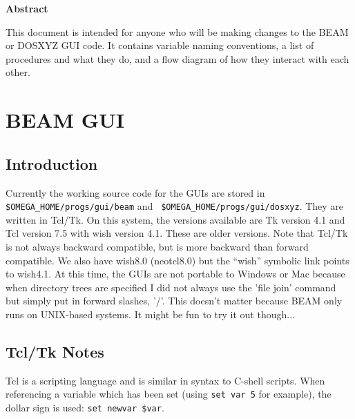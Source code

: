 \documentclass[12pt]{book}
\begin{document}
\newpage

\begin{center}
\begin{Large}
{\bf Abstract}
\end{Large}
\end{center}
This document is intended for anyone who will be making changes to the
BEAM or DOSXYZ GUI code.  It contains variable naming conventions, a list of
procedures and what they do, and a flow diagram of how they interact
with each other.
\vspace*{4cm}\\

\tableofcontents

\setlength{\baselineskip}{0.5cm}

\newpage


\chapter{BEAM GUI}

{\sffamily
\section{Introduction}
}


Currently the working source code for the GUIs are stored in
{\tt \$OMEGA\_HOME/progs/gui/beam} and {\tt
\$OMEGA\_HOME/progs/gui/dosxyz}.  They are written in Tcl/Tk.  On this
system, the
versions available are Tk version 4.1 and Tcl version 7.5 with wish
version 4.1.  These are older versions.  Note that Tcl/Tk is not always
backward compatible, but is more backward than forward compatible.  We
also have wish8.0 (neotcl8.0) but the ``wish'' symbolic link points to wish4.1.
At this time, the GUIs are not portable to Windows or Mac because when
directory trees are specified I did not always use the 'file join' command but
simply put in forward slashes, '/'.  This doesn't matter because BEAM
only runs on UNIX-based systems.  It might be fun to try it out though...

\section{Tcl/Tk Notes}

Tcl is a scripting language and is similar in syntax to C-shell
scripts.  When referencing a variable which has been set (using
{\tt set var 5} for example), the dollar sign is used:
{\tt set newvar \$var}.
\end{document}
